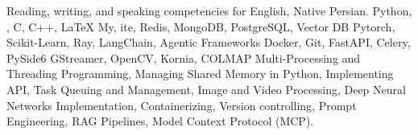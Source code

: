 
\begin{rubric}{}
\entry*[Languages]
	  Reading, writing, and speaking competencies for English, Native Persian.
	  Python, , C, C++, \LaTeX
\entry*[Databases]
	My, ite, Redis, MongoDB, PostgreSQL, Vector DB
\entry*[ML Frameworks]
	Pytorch, Scikit-Learn, Ray, LangChain, Agentic Frameworks
        Docker, Git, FastAPI, Celery, PySide6
        GStreamer, OpenCV, Kornia, COLMAP
\entry*[Misc.]
	Multi-Processing and Threading Programming, Managing Shared Memory in Python, Implementing API, Task Queuing and Management, Image and Video Processing, Deep Neural Networks Implementation, Containerizing, Version controlling, Prompt Engineering, RAG Pipelines, Model Context Protocol (MCP).
\end{rubric}
